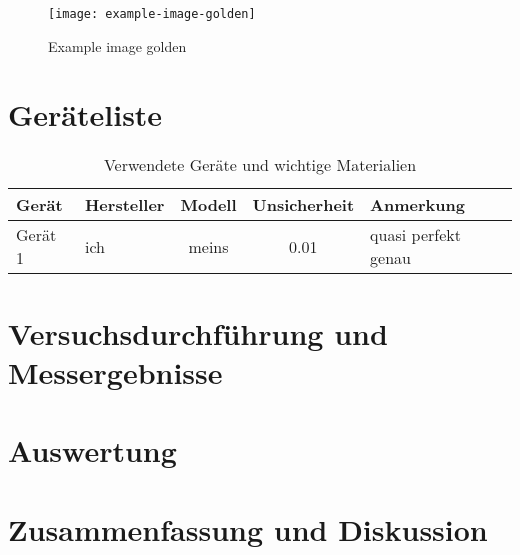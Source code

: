 \documentclass[11pt, DIV=8, ngerman]{scrartcl}
\begin{document}
\begin{figure}[H]  %
    \centering
    \begin{samepage}  %
        \texttt{[image: example-image-golden]}
        \caption{Example image golden}
        \label{fig:example-image-golden}
    \end{samepage}
\end{figure}



\section{Geräteliste}
\label{sec:geraeteliste}

\begin{table}[!h]
    \centering  %
    \begin{samepage}  %
        \caption[Geräteliste]{Verwendete Geräte und wichtige Materialien}  %
        \label{tab:geraeteliste}
        \begin{tabularx}{\textwidth}{|Y|Y|c|c|Y|} \hline
            Gerät & Hersteller & Modell & Unsicherheit& Anmerkung \\ \hline
            Gerät 1 & ich & meins & \num{0.01} & quasi perfekt genau \\ \hline
        \end{tabularx}
    \end{samepage}
\end{table}



\section{Versuchsdurchführung und Messergebnisse}
\label{sec:versuchsdurchfuehrung_messergebnisse}



\section{Auswertung}
\label{sec:auswertung}



\section{Zusammenfassung und Diskussion}
\label{sec:zusammenfassung_diskussion}



\clearpage
\printbibliography

\listoffigures

\listoftables
\end{document}
